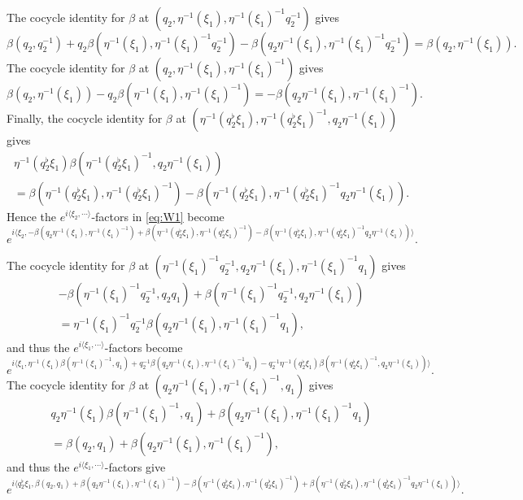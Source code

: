 \documentclass[a4paper,11pt,reqno]{amsart}
\numberwithin{equation}{section}
\theoremstyle{remark}
\theoremstyle{definition}
\begin{document}
The cocycle identity for $\beta$ at $(q_2,\eta^{-1}(\xi_1),\eta^{-1}(\xi_1)^{-1}q_2^{-1})$ gives
$$
\beta(q_2,q_2^{-1})+q_2\beta(\eta^{-1}(\xi_1),\eta^{-1}(\xi_1)^{-1}q_2^{-1})
-\beta(q_2\eta^{-1}(\xi_1),\eta^{-1}(\xi_1)^{-1}q_2^{-1})=\beta(q_2,\eta^{-1}(\xi_1)).
$$
The cocycle identity for $\beta$ at $(q_2,\eta^{-1}(\xi_1),\eta^{-1}(\xi_1)^{-1})$ gives
$$
\beta(q_2,\eta^{-1}(\xi_1))-q_2\beta(\eta^{-1}(\xi_1),\eta^{-1}(\xi_1)^{-1}) =-\beta(q_2\eta^{-1}(\xi_1),\eta^{-1}(\xi_1)^{-1}).
$$
Finally, the cocycle identity for $\beta$ at $( \eta^{-1}(q_2^\flat\xi_1),\eta^{-1}(q_2^\flat\xi_1)^{-1},q_2\eta^{-1}(\xi_1))$ gives
\begin{multline*}
 \eta^{-1}(q_2^\flat\xi_1)\beta(\eta^{-1}(q_2^\flat\xi_1)^{-1},q_2\eta^{-1}(\xi_1))\\=
 \beta( \eta^{-1}(q_2^\flat\xi_1),\eta^{-1}(q_2^\flat\xi_1)^{-1})- \beta(\eta^{-1}(q_2^\flat\xi_1),\eta^{-1}(q_2^\flat\xi_1)^{-1}q_2\eta^{-1}(\xi_1)).
\end{multline*}
Hence the $e^{i\langle\xi_2,\cdots\rangle}$-factors in \eqref{eq:W1} become
\begin{equation}\label{eq:xi2}
e^{i\langle \xi_2,-\beta(q_2\eta^{-1}(\xi_1),\eta^{-1}(\xi_1)^{-1})+ \beta( \eta^{-1}(q_2^\flat\xi_1),\eta^{-1}(q_2^\flat\xi_1)^{-1})
- \beta(\eta^{-1}(q_2^\flat\xi_1),\eta^{-1}(q_2^\flat\xi_1)^{-1}q_2\eta^{-1}(\xi_1))\rangle}.
\end{equation}

The cocycle identity for $\beta$ at $(\eta^{-1}(\xi_1)^{-1}q_2^{-1},q_2\eta^{-1}(\xi_1),\eta^{-1}(\xi_1)^{-1}q_1)$ gives
\begin{multline*}
-\beta(\eta^{-1}(\xi_1)^{-1}q_2^{-1},q_2q_1)+\beta(\eta^{-1}(\xi_1)^{-1}q_2^{-1},q_2\eta^{-1}(\xi_1))\\
=\eta^{-1}(\xi_1)^{-1}q_2^{-1}\beta(q_2\eta^{-1}(\xi_1),\eta^{-1}(\xi_1)^{-1}q_1),
\end{multline*}
and thus the $e^{i\langle\xi_1,\cdots\rangle}$-factors become
$$
e^{i\langle \xi_1 ,\eta^{-1}(\xi_1)\beta(\eta^{-1}(\xi_1)^{-1},q_1)+q_2^{-1}\beta(q_2\eta^{-1}(\xi_1),\eta^{-1}(\xi_1)^{-1}q_1)
   -q_2^{-1}\eta^{-1}(q_2^\flat\xi_1)\beta(\eta^{-1}(q_2^\flat\xi_1)^{-1},q_2\eta^{-1}(\xi_1))\rangle}.
$$
The cocycle identity for $\beta$ at $(q_2\eta^{-1}(\xi_1),\eta^{-1}(\xi_1)^{-1},q_1)$ gives
\begin{multline*}
 q_2 \eta^{-1}(\xi_1)\beta(\eta^{-1}(\xi_1)^{-1},q_1)+\beta(q_2\eta^{-1}(\xi_1),\eta^{-1}(\xi_1)^{-1}q_1)\\ =
 \beta(q_2,q_1)+\beta(q_2\eta^{-1}(\xi_1),\eta^{-1}(\xi_1)^{-1}),
\end{multline*}
and thus the $e^{i\langle\xi_1,\cdots\rangle}$-factors give
\begin{equation}\label{eq:xi1}
e^{i\langle q_2^\flat\xi_1 ,\beta(q_2,q_1)+\beta(q_2\eta^{-1}(\xi_1),\eta^{-1}(\xi_1)^{-1})
   - \beta( \eta^{-1}(q_2^\flat\xi_1),\eta^{-1}(q_2^\flat\xi_1)^{-1})+ \beta(\eta^{-1}(q_2^\flat\xi_1),\eta^{-1}(q_2^\flat\xi_1)^{-1}q_2\eta^{-1}(\xi_1))\rangle}.
\end{equation}
\end{document}
